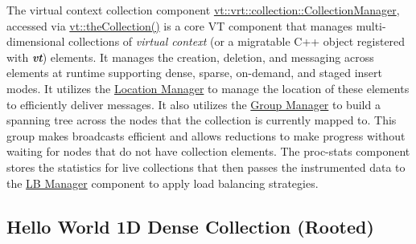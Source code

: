 The virtual context collection component {\ttfamily \hyperlink{structvt_1_1vrt_1_1collection_1_1_collection_manager}{vt\+::vrt\+::collection\+::\+Collection\+Manager}}, accessed via {\ttfamily \hyperlink{namespacevt_a1c45ce63bfd2c327ff7d76a319a371d8}{vt\+::the\+Collection()}} is a core VT component that manages multi-\/dimensional collections of {\itshape virtual context} (or a migratable C++ object registered with {\bfseries {\itshape vt}}) elements. It manages the creation, deletion, and messaging across elements at runtime supporting dense, sparse, on-\/demand, and staged insert modes. It utilizes the \hyperlink{location}{Location Manager} to manage the location of these elements to efficiently deliver messages. It also utilizes the \hyperlink{group}{Group Manager} to build a spanning tree across the nodes that the collection is currently mapped to. This group makes broadcasts efficient and allows reductions to make progress without waiting for nodes that do not have collection elements. The proc-\/stats component stores the statistics for live collections that then passes the instrumented data to the \hyperlink{lb-manager}{LB Manager} component to apply load balancing strategies.\hypertarget{collection_rooted-hello-world-collection}{}\subsection{Hello World 1\+D Dense Collection (\+Rooted)}\label{collection_rooted-hello-world-collection}

